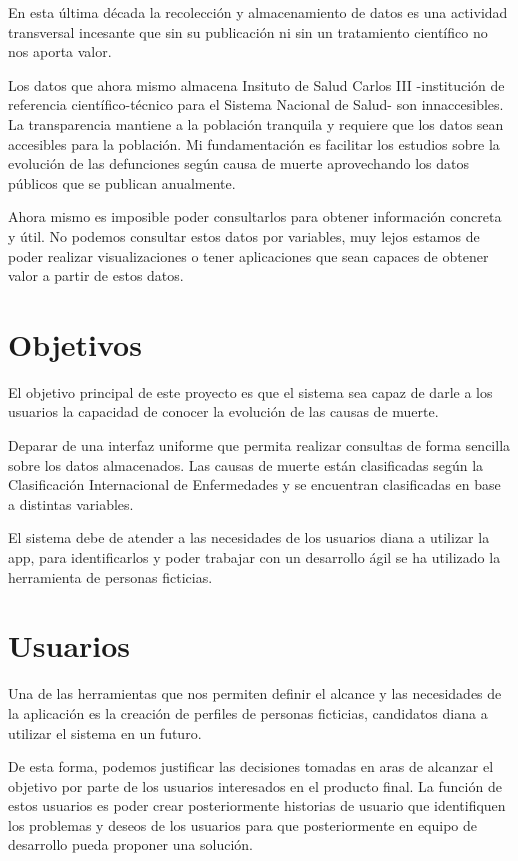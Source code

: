 En esta última década la recolección y almacenamiento de datos es una actividad transversal incesante que sin su publicación ni sin un tratamiento científico no nos aporta valor. 

Los datos que ahora mismo almacena Insituto de Salud Carlos III -institución de referencia científico-técnico para el Sistema Nacional de Salud- son innaccesibles. La transparencia mantiene a la población tranquila y requiere que los datos sean accesibles para la población. Mi fundamentación es facilitar los estudios sobre la evolución de las defunciones según causa de muerte aprovechando los datos públicos que se publican anualmente.

Ahora mismo es imposible poder consultarlos para obtener información concreta y útil. No podemos consultar estos datos por variables, muy lejos estamos de poder realizar visualizaciones o tener aplicaciones que sean capaces de obtener valor a partir de estos datos.

\section{Objetivos}
\label{sec:obj}
El objetivo principal de este proyecto es que el sistema sea capaz de darle a los usuarios la capacidad de conocer la evolución de las causas de muerte. 

Deparar de una interfaz uniforme que permita realizar consultas de forma sencilla sobre los datos almacenados. Las causas de muerte están clasificadas según la Clasificación Internacional de Enfermedades y se encuentran clasificadas en base a distintas variables. 

El sistema debe de atender a las necesidades de los usuarios diana a utilizar la app, para identificarlos y poder trabajar con un desarrollo ágil se ha utilizado la herramienta de personas ficticias.

\section{Usuarios}
\label{sec:usu}
Una de las herramientas que nos permiten definir el alcance y las necesidades de la aplicación es la creación de perfiles de personas ficticias, candidatos diana a utilizar el sistema en un futuro.

De esta forma, podemos justificar las decisiones tomadas en aras de alcanzar el objetivo por parte de los usuarios interesados en el producto final. La función de estos usuarios es poder crear posteriormente historias de usuario que identifiquen los problemas y deseos de los usuarios para que posteriormente en equipo de desarrollo pueda proponer una solución.

